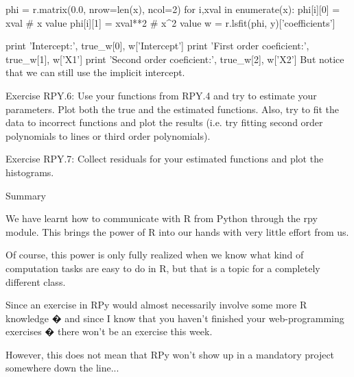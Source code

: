 phi = r.matrix(0.0, nrow=len(x), ncol=2)
for i,xval in enumerate(x):
    phi[i][0] = xval                    # x value
    phi[i][1] = xval**2                 # x^2 value
w = r.lsfit(phi, y)['coefficients']

print 'Intercept:', true_w[0], w['Intercept']
print 'First order coeficient:', true_w[1], w['X1']
print 'Second order coeficient:', true_w[2], w['X2']
But notice that we can still use the implicit intercept.

Exercise RPY.6: Use your functions from RPY.4 and try to estimate your parameters. Plot both the true and the estimated functions. Also, try to fit the data to incorrect functions and plot the results (i.e. try fitting second order polynomials to lines or third order polynomials).

Exercise RPY.7: Collect residuals for your estimated functions and plot the histograms.

Summary

We have learnt how to communicate with R from Python through the rpy module. This brings the power of R into our hands with very little effort from us.

Of course, this power is only fully realized when we know what kind of computation tasks are easy to do in R, but that is a topic for a completely different class.

Since an exercise in RPy would almost necessarily involve some more R knowledge � and since I know that you haven't finished your web-programming exercises � there won't be an exercise this week.

However, this does not mean that RPy won't show up in a mandatory project somewhere down the line...

